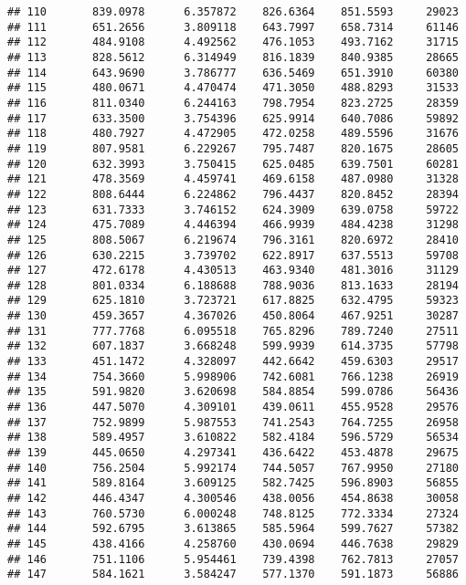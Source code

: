 \documentclass[]{article}
\begin{document}
\begin{verbatim}
## 110       839.0978      6.357872    826.6364    851.5593     29023
## 111       651.2656      3.809118    643.7997    658.7314     61146
## 112       484.9108      4.492562    476.1053    493.7162     31715
## 113       828.5612      6.314949    816.1839    840.9385     28665
## 114       643.9690      3.786777    636.5469    651.3910     60380
## 115       480.0671      4.470474    471.3050    488.8293     31533
## 116       811.0340      6.244163    798.7954    823.2725     28359
## 117       633.3500      3.754396    625.9914    640.7086     59892
## 118       480.7927      4.472905    472.0258    489.5596     31676
## 119       807.9581      6.229267    795.7487    820.1675     28605
## 120       632.3993      3.750415    625.0485    639.7501     60281
## 121       478.3569      4.459741    469.6158    487.0980     31328
## 122       808.6444      6.224862    796.4437    820.8452     28394
## 123       631.7333      3.746152    624.3909    639.0758     59722
## 124       475.7089      4.446394    466.9939    484.4238     31298
## 125       808.5067      6.219674    796.3161    820.6972     28410
## 126       630.2215      3.739702    622.8917    637.5513     59708
## 127       472.6178      4.430513    463.9340    481.3016     31129
## 128       801.0334      6.188688    788.9036    813.1633     28194
## 129       625.1810      3.723721    617.8825    632.4795     59323
## 130       459.3657      4.367026    450.8064    467.9251     30287
## 131       777.7768      6.095518    765.8296    789.7240     27511
## 132       607.1837      3.668248    599.9939    614.3735     57798
## 133       451.1472      4.328097    442.6642    459.6303     29517
## 134       754.3660      5.998906    742.6081    766.1238     26919
## 135       591.9820      3.620698    584.8854    599.0786     56436
## 136       447.5070      4.309101    439.0611    455.9528     29576
## 137       752.9899      5.987553    741.2543    764.7255     26958
## 138       589.4957      3.610822    582.4184    596.5729     56534
## 139       445.0650      4.297341    436.6422    453.4878     29675
## 140       756.2504      5.992174    744.5057    767.9950     27180
## 141       589.8164      3.609125    582.7425    596.8903     56855
## 142       446.4347      4.300546    438.0056    454.8638     30058
## 143       760.5730      6.000248    748.8125    772.3334     27324
## 144       592.6795      3.613865    585.5964    599.7627     57382
## 145       438.4166      4.258760    430.0694    446.7638     29829
## 146       751.1106      5.954461    739.4398    762.7813     27057
## 147       584.1621      3.584247    577.1370    591.1873     56886

\end{verbatim}
\end{document}

